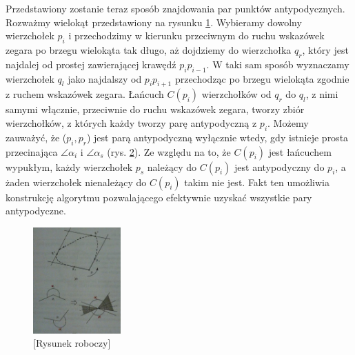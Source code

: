 \begin{figure}[htp]
\centering
\caption{\label{fig:antipodal}}
\end{figure}

Przedstawiony zostanie teraz sposób znajdowania par punktów
antypodycznych. Rozważmy wielokąt przedstawiony na
rysunku \ref{fig:antipodal}. Wybieramy dowolny wierzchołek $p_i$ i
przechodzimy w kierunku przeciwnym do ruchu wskazówek zegara po brzegu
wielokąta tak długo, aż dojdziemy do wierzchołka $q_r$, który jest
najdalej od prostej zawierającej krawędź $p_{i}p_{i-1}$. W taki sam
sposób wyznaczamy wierzchołek $q_l$ jako najdalszy od $p_{i}p_{i+1}$
przechodząc po brzegu wielokąta zgodnie z ruchem wskazówek
zegara. Łańcuch $C(p_i)$ wierzchołków od $q_r$ do $q_l$, z nimi samymi
włącznie, przeciwnie do ruchu wskazówek zegara, tworzy zbiór
wierzchołków, z których każdy tworzy parę antypodyczną z $p_i$. Możemy
zauważyć, że ($p_{i},p_{r}$) jest parą antypodyczną wyłącznie wtedy,
gdy istnieje prosta przecinająca $\angle \alpha_i$ i $\angle \alpha_s$
(rys. \ref{fig:diameter}). Ze względu na to, że $C(p_i)$ jest
łańcuchem wypukłym, każdy wierzchołek $p_s$ należący do $C(p_i)$ jest
antypodyczny do $p_i$, a żaden wierzchołek nienależący do $C(p_i)$
takim nie jest. Fakt ten umożliwia konstrukcję algorytmu pozwalającego
efektywnie uzyskać wszystkie pary antypodyczne.

\begin{figure}[htp]
  \centering
  \includegraphics[width=0.3\textwidth]{img/diameter}
  \caption{[Rysunek roboczy]\label{fig:diameter}}
\end{figure}

